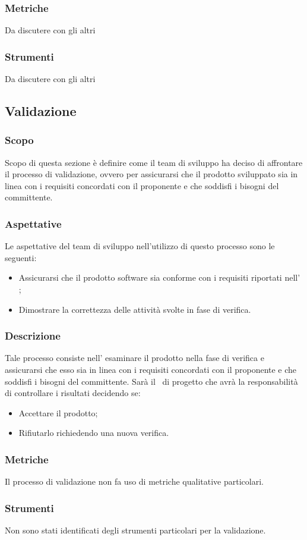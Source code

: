     \subsubsection{Metriche}
    Da discutere con gli altri

    \subsubsection{Strumenti}
    Da discutere con gli altri
    

\pagebreak

\subsection{Validazione}\label{subsection: validazione}
\subsubsection{Scopo}
Scopo di questa sezione è definire come il team di sviluppo ha deciso di affrontare il processo di validazione, ovvero per assicurarsi che il prodotto sviluppato sia in linea con i requisiti concordati con il proponente e che soddisfi i bisogni del committente.
\subsubsection{Aspettative}
Le aspettative del team di sviluppo nell'utilizzo di questo processo sono le seguenti: 
\begin{itemize}
    \item Assicurarsi che il prodotto software sia conforme con i requisiti riportati nell' \docNameAdRLow;
    \item  Dimostrare la correttezza delle attività svolte in fase di verifica.
\end{itemize}
\subsubsection{Descrizione}
Tale processo consiste nell' esaminare il prodotto nella fase di verifica e assicurarsi che esso sia in linea con i requisiti concordati con il proponente e che soddisfi i bisogni del committente.
Sarà il \roleProjectManagerLow\ di progetto che avrà la responsabilità di controllare i risultati decidendo se:
\begin{itemize}
    \item Accettare il prodotto;
    \item Rifiutarlo richiedendo una nuova verifica.
\end{itemize}    
\subsubsection{Metriche}
Il processo di validazione non fa uso di metriche qualitative particolari.

\subsubsection{Strumenti}
Non sono stati identificati degli strumenti particolari per la validazione.


